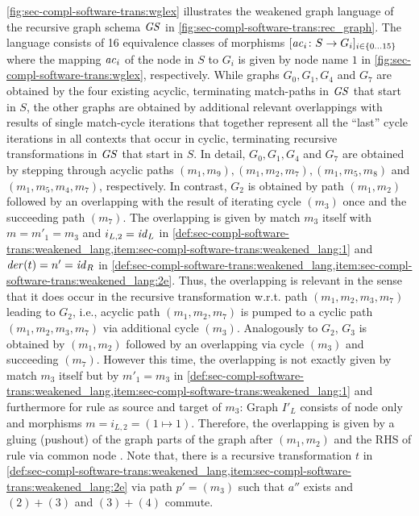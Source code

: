 \begin{example}
\label{ex:sec-dc-general-rec:weakened_graph_lang}
\cref{fig:sec-compl-software-trans:wglex} illustrates the weakened graph language of the recursive graph schema $\mathit{GS}$ in \cref{fig:sec-compl-software-trans:rec_graph}.
The language consists of 16 equivalence classes of morphisms $[\mathit{ac}_i\colon S \to G_i]_{i \in \{0\ldots 15\}}$ where the mapping $\mathit{ac}_i$ of the  node in $S$ to $G_i$ is given by node name $1$ in \cref{fig:sec-compl-software-trans:wglex}, respectively.
While graphs $G_0,G_1,G_4$ and $G_7$ are obtained by the four existing acyclic, terminating match-paths in $\mathit{GS}$ that start in $S$, the other graphs are obtained by additional relevant overlappings with results of single match-cycle iterations that together represent all the ``last'' cycle iterations in all contexts that occur in cyclic, terminating recursive transformations in $\mathit{GS}$ that start in $S$.
In detail, $G_0,G_1,G_4$ and $G_7$ are obtained by stepping through acyclic paths $(m_1,m_9),(m_1,m_2,m_7),(m_1,m_5,m_8)$ and $(m_1,m_5,m_4,m_7)$, respectively.
In contrast, $G_2$ is obtained by path $(m_1,m_2)$ followed by an overlapping with the result of iterating cycle $(m_3)$ once and the succeeding path $(m_7)$.
The overlapping is given by match $m_3$ itself with $m=m'_1=m_3$ and $i_{L,2}=\mathit{id}_L$ in \cref{def:sec-compl-software-trans:weakened_lang,item:sec-compl-software-trans:weakened_lang:1} and $\mathit{der}(t)=n'=\mathit{id}_R$ in \cref{def:sec-compl-software-trans:weakened_lang,item:sec-compl-software-trans:weakened_lang:2e}.
Thus, the overlapping is relevant in the sense that it does occur in the recursive transformation w.r.t. path $(m_1,m_2,m_3,m_7)$ leading to $G_2$, i.e., acyclic path $(m_1,m_2,m_7)$ is pumped to a cyclic path $(m_1,m_2,m_3,m_7)$ via additional cycle $(m_3)$.
Analogously to $G_2$, $G_3$ is obtained by $(m_1,m_2)$ followed by an overlapping via cycle $(m_3)$ and succeeding $(m_7)$.
However this time, the overlapping is not exactly given by match $m_3$ itself but by $m'_1=m_3$ in \cref{def:sec-compl-software-trans:weakened_lang,item:sec-compl-software-trans:weakened_lang:1} and furthermore for rule  as source and target of $m_3$: Graph $I'_L$ consists of node  only and morphisms $m=i_{L,2}=(1 \mapsto 1)$.
Therefore, the overlapping is given by a gluing (pushout) of the graph parts of the graph after $(m_1,m_2)$ and the RHS of rule  via common node .
Note that, there is a recursive transformation $t$ in \cref{def:sec-compl-software-trans:weakened_lang,item:sec-compl-software-trans:weakened_lang:2e} via path $p'=(m_3)$ such that $a''$ exists and $(2)+(3)$ and $(3)+(4)$ commute.

\end{example}
